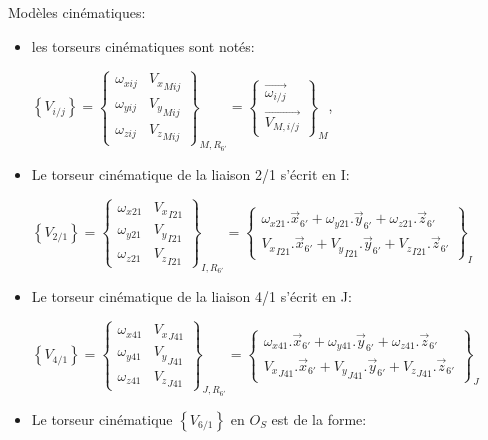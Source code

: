 Modèles cinématiques:
\begin{itemize}
 \item les torseurs cinématiques sont notés: 

$\left\{V_{i/j}\right\}=\left\{
\begin{matrix}
 \omega_{xij} & {V_x }_{Mij} \\
 \omega_{yij} & {V_y }_{Mij} \\
 \omega_{zij} & {V_z}_{Mij} 
\end{matrix}
\right\}_{M,R_{6'}}=\left \{\begin{matrix} \vec {\omega _{i/ j}} \\ 
 \overrightarrow {V_{M,i/j}}\end{matrix}\right \}_M$,
 \item Le torseur cinématique de la liaison 2/1 s'écrit en I:
 
$\left\{V_{2/ 1}\right\}=\left\{
\begin{matrix}
 \omega_{x21} & {V_x }_{I21} \\
 \omega_{y21} & {V_y }_{I21} \\
 \omega_{z21} & {V_z}_{I21} 
\end{matrix}
\right\}_{I,R_{6'}}=\left \{\begin{matrix} \omega_{x21}.\vec{x}_{6'}+\omega_{y21}.\vec{y}_{6'}+\omega_{z21}.\vec{z}_{6'} \\ 
 {V_x }_{I21}.\vec{x}_{6'}+{V_y }_{I21}.\vec{y}_{6'}+{V_z}_{I21}.\vec{z}_{6'}\end{matrix}\right \}_{I}$
 \item Le torseur cinématique de la liaison 4/1 s'écrit en J:
 
$\left \{V_{4/ 1}\right\}=\left\{
\begin{matrix}
 \omega_{x41} & {V_x }_{J41} \\
 \omega_{y41} & {V_y }_{J41} \\
 \omega_{z41} & {V_z}_{J41} 
\end{matrix}
\right\}_{J,R_{6'}}=\left \{\begin{matrix} \omega_{x41}.\vec{x}_{6'}+\omega_{y41}.\vec{y}_{6'}+\omega_{z41}.\vec{z}_{6'} \\ 
 {V_x }_{J41}.\vec{x}_{6'}+{V_y }_{J41}.\vec{y}_{6'}+{V_z}_{J41}.\vec{z}_{6'}\end{matrix}\right \}_{J}$
 \item Le torseur cinématique $\left \{V_{6/ 1}\right\}$ en $O_S$ est de la forme:
 

\end{itemize}
